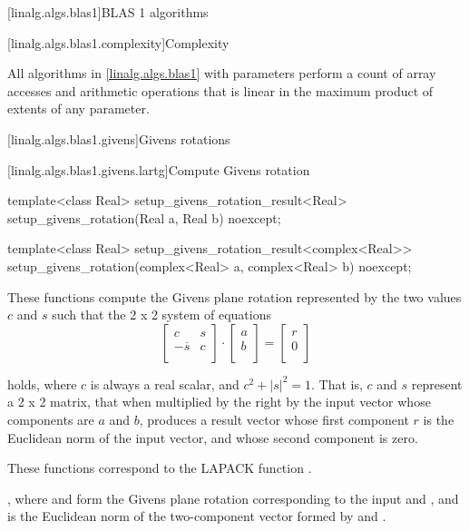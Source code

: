 [linalg.algs.blas1]{BLAS 1 algorithms}

[linalg.algs.blas1.complexity]{Complexity}

\pnum
\complexity
All algorithms in \ref{linalg.algs.blas1} with  parameters
perform a count of  array accesses
and arithmetic operations that is linear in
the maximum product of extents of any  parameter.

[linalg.algs.blas1.givens]{Givens rotations}

[linalg.algs.blas1.givens.lartg]{Compute Givens rotation}

%
\begin{itemdecl}
template<class Real>
  setup_givens_rotation_result<Real> setup_givens_rotation(Real a, Real b) noexcept;

template<class Real>
  setup_givens_rotation_result<complex<Real>>
    setup_givens_rotation(complex<Real> a, complex<Real> b) noexcept;
\end{itemdecl}

\begin{itemdescr}
\pnum
These functions compute the Givens plane rotation
represented by the two values $c$ and $s$
such that the 2 x 2 system of equations
\begin{equation*}
\left[ \begin{matrix}
c             & s \\
-\overline{s} & c \\
\end{matrix} \right]
\cdot
\left[ \begin{matrix}
a \\
b \\
\end{matrix} \right]
=
\left[ \begin{matrix}
r \\
0 \\
\end{matrix} \right]
\end{equation*}

holds, where $c$ is always a real scalar, and $c^2 + |s|^2 = 1$.
That is, $c$ and $s$ represent a 2 x 2 matrix,
that when multiplied by the right by the input vector
whose components are $a$ and $b$,
produces a result vector
whose first component $r$ is the Euclidean norm of the input vector, and
whose second component is zero.
\begin{note}
These functions correspond to the LAPACK function \supercite{lapack}.
\end{note}

\pnum
\returns
{},
where  and  form the Givens plane rotation
corresponding to the input  and ,
and  is the Euclidean norm of the two-component vector
formed by  and .
\end{itemdescr}

